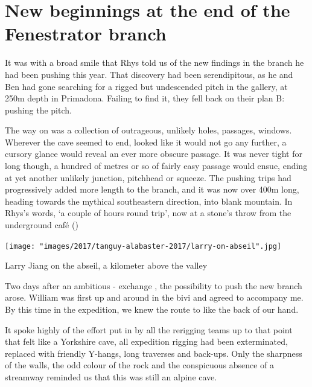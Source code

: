 \section{New beginnings at the end of the Fenestrator branch}

    


It was with a broad smile that Rhys told us of the new findings in the  branch he had been pushing this year. That discovery had been serendipitous, as he and Ben had gone searching for a rigged but undescended pitch in the  gallery, at 250m depth in \passage[cave]Primadona. Failing to find it, they fell back on their plan B: pushing the  pitch.

The way on was a collection of  outrageous, unlikely holes, passages, windows. Wherever the cave seemed to end, looked like it would not go any further, a cursory glance would reveal an ever more obscure passage. It was never tight for long though, a hundred of metres or so of fairly easy passage would ensue, ending at yet another unlikely junction, pitchhead or squeeze. The pushing trips had progressively added more length to the branch, and it was now over 400m long, heading towards the mythical southeastern direction, into blank mountain. In Rhys's words, `a couple of hours round trip', now at a stone's throw from the underground café ()

\begin{marginfigure} \centering \vspace{-115pt}
\texttt{[image: "images/2017/tanguy-alabaster-2017/larry-on-abseil".jpg]}
\caption{Larry Jiang on the  abseil, a kilometer above the \protect{} valley }
\end{marginfigure}

Two days after an ambitious - exchange , the possibility to push the new branch arose. William was first up and around in the bivi and agreed to accompany me. By this time in the expedition, we knew the route to  like the back of our hand. 

It spoke highly of the effort put in by all the rerigging teams up to that point that  felt like a Yorkshire cave, all expedition rigging had been exterminated, replaced with friendly Y-hangs, long traverses and back-ups.  Only the sharpness of the walls, the odd colour of the rock and the conspicuous absence of a streamway reminded us that this was still an alpine cave.

